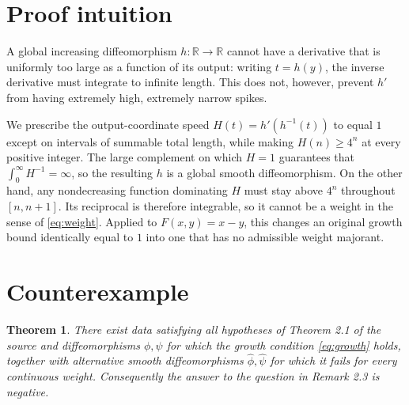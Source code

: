 \documentclass[11pt]{article}
\newtheorem{theorem}{Theorem}
\newcommand{\R}{\mathbb R}
\begin{document}
\section{Proof intuition}

A global increasing diffeomorphism $h:\R\to\R$ cannot have a derivative that
is uniformly too large as a function of its output: writing $t=h(y)$, the
inverse derivative must integrate to infinite length.  This does not,
however, prevent $h'$ from having extremely high, extremely narrow spikes.

We prescribe the output-coordinate speed
$H(t)=h'(h^{-1}(t))$ to equal $1$ except on intervals of summable total
length, while making $H(n)\geq4^n$ at every positive integer.  The large
complement on which $H=1$ guarantees that $\int_0^\infty H^{-1}=\infty$, so
the resulting $h$ is a global smooth diffeomorphism.  On the other hand, any
nondecreasing function dominating $H$ must stay above $4^n$ throughout
$[n,n+1]$.  Its reciprocal is therefore integrable, so it cannot be a weight
in the sense of \eqref{eq:weight}.  Applied to $F(x,y)=x-y$, this changes an
original growth bound identically equal to $1$ into one that has no admissible
weight majorant.

\section{Counterexample}

\begin{theorem}\label{thm:counterexample}
There exist data satisfying all hypotheses of Theorem 2.1 of the source and
diffeomorphisms $\phi,\psi$ for which the growth condition
\eqref{eq:growth} holds, together with alternative smooth diffeomorphisms
$\widehat\phi,\widehat\psi$ for which it fails for every continuous weight.
Consequently the answer to the question in Remark 2.3 is negative.
\end{theorem}
\end{document}
